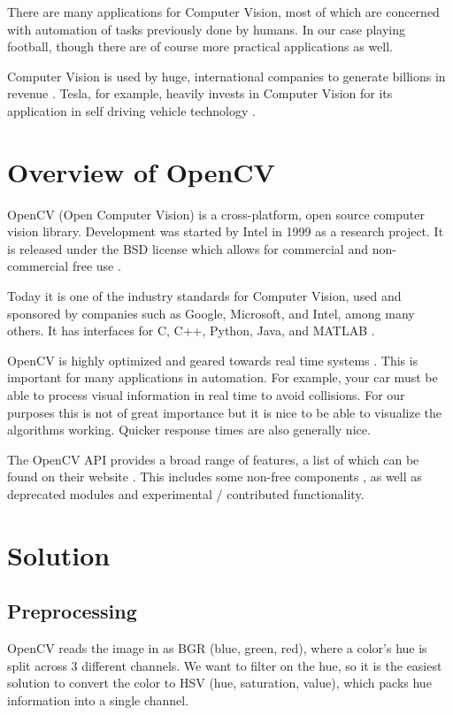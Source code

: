 \documentclass[12pt, a4paper]{article}
\begin{document}
There are many applications for Computer Vision, most of which are concerned with automation of tasks previously done by humans. In our case playing football, though there are of course more practical applications as well.

Computer Vision is used by huge, international companies to generate billions in revenue \cite{teslaValue}. Tesla, for example, heavily invests in Computer Vision for its application in self driving vehicle technology \cite{teslaAutopilot} \cite{teslaCVArticle}.

\section{Overview of OpenCV}
OpenCV (Open Computer Vision) is a cross-platform, open source computer vision library. Development was started by Intel in 1999 as a research project. It is released under the BSD license which allows for commercial and non-commercial free use \cite{learningOpenCV}.

Today it is one of the industry standards for Computer Vision, used and sponsored by companies such as Google, Microsoft, and Intel, among many others. It has interfaces for C, C++, Python, Java, and MATLAB \cite{aboutOpenCV}.

OpenCV is highly optimized and geared towards real time systems \cite{aboutOpenCV}. This is important for many applications in automation. For example, your car must be able to process visual information in real time to avoid collisions.
For our purposes this is not of great importance but it is nice to be able to visualize the algorithms working. Quicker response times are also generally nice.

The OpenCV API provides a broad range of features, a list of which can be found on their website \cite{openCVRefMan}. This includes some non-free components \cite{openCVNonFree}, as well as deprecated modules and experimental / contributed functionality.

\section{Solution}
\subsection{Preprocessing}
OpenCV reads the image in as BGR (blue, green, red), where a color's hue is split across 3 different channels. We want to filter on the hue, so it is the easiest solution to convert the color to HSV (hue, saturation, value), which packs hue information into a single channel.
\end{document}
